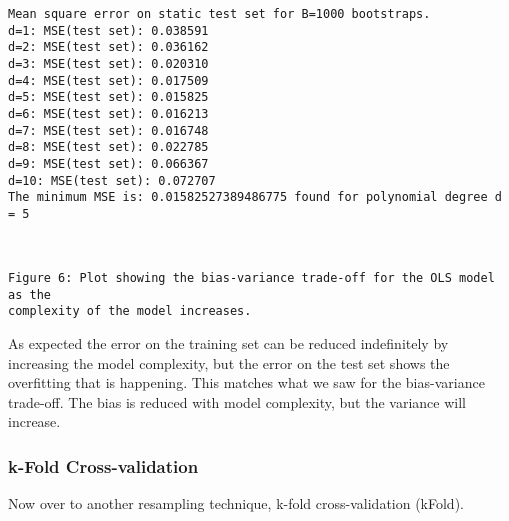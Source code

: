 \documentclass[11pt]{article}
\begin{document}
    \begin{Verbatim}[commandchars=\\\{\}]
Mean square error on static test set for B=1000 bootstraps.
d=1: MSE(test set): 0.038591
d=2: MSE(test set): 0.036162
d=3: MSE(test set): 0.020310
d=4: MSE(test set): 0.017509
d=5: MSE(test set): 0.015825
d=6: MSE(test set): 0.016213
d=7: MSE(test set): 0.016748
d=8: MSE(test set): 0.022785
d=9: MSE(test set): 0.066367
d=10: MSE(test set): 0.072707
The minimum MSE is: 0.01582527389486775 found for polynomial degree d = 5
    \end{Verbatim}

    \begin{center}
    \end{center}
    { \hspace*{\fill} \\}
    
    \begin{Verbatim}[commandchars=\\\{\}]
Figure 6: Plot showing the bias-variance trade-off for the OLS model as the
complexity of the model increases.
    \end{Verbatim}

    As expected the error on the training set can be reduced indefinitely by
increasing the model complexity, but the error on the test set shows the
overfitting that is happening. This matches what we saw for the
bias-variance trade-off. The bias is reduced with model complexity, but
the variance will increase.

\hypertarget{k-fold-cross-validation}{%
\subsubsection{k-Fold Cross-validation}\label{k-fold-cross-validation}}

Now over to another resampling technique, k-fold cross-validation
(kFold).
\end{document}
